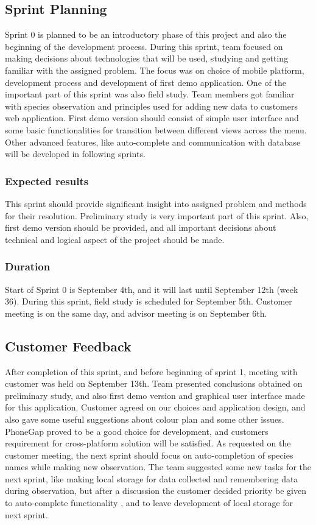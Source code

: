 \subsection{Sprint Planning}
	Sprint 0 is planned to be an introductory phase of this project and also the beginning of the development process. During this sprint, team focused on making decisions about technologies that will be used, studying and getting familiar with the assigned problem. The focus was on choice of mobile platform, development process and development of first demo application. One of the important part of this sprint was also field study. Team members got familiar with species observation and principles used for adding new data to customers web application.\newline
	First demo version should consist of simple user interface and some basic functionalities for transition between different views across the menu. Other advanced features, like auto-complete and communication with database will be developed in following sprints.
	
	\subsubsection{Expected results}
	This sprint should provide significant insight into assigned problem and methods for their resolution. Preliminary study is very important part of this sprint. Also, first demo version should be provided, and all important decisions about technical and logical aspect of the project should be made.
	
	\subsubsection{Duration}
	Start of Sprint 0 is September 4th, and it will last until September 12th (week 36). During this sprint, field study is scheduled for September 5th. Customer meeting is on the same day, and advisor meeting is on September 6th.
	
	
	
\subsection{Customer Feedback}
	After completion of this sprint, and before beginning of sprint 1, meeting with customer was held on September 13th. Team presented conclusions obtained on preliminary study, and also first demo version and graphical user interface made for this application. Customer agreed on our choices and application design, and also gave some useful suggestions about colour plan and some other issues. PhoneGap proved to be a good choice for development, and customers requirement for cross-platform solution will be satisfied.\newline
	As requested on the customer meeting, the next sprint should focus on auto-completion of species names while making new observation. The team suggested some new tasks for the next sprint, like making local storage for data collected and remembering data during observation, but after a discussion the customer decided priority be given to auto-complete functionality , and to leave development of local storage for next sprint.
	
